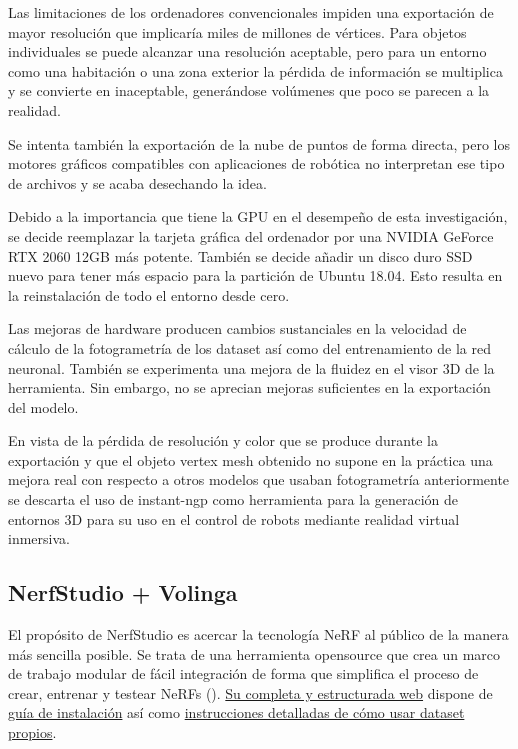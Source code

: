 \documentclass[a4paper, 12pt, spanish, twoside]{article}
\begin{document}
Las limitaciones de los ordenadores convencionales impiden una exportación de mayor resolución que implicaría miles de millones de vértices. Para objetos individuales se puede alcanzar una resolución aceptable, pero para un entorno como una habitación o una zona exterior la pérdida de información se multiplica y se convierte en inaceptable, generándose volúmenes que poco se parecen a la realidad. 



Se intenta también la exportación de la nube de puntos de forma directa, pero los motores gráficos compatibles con aplicaciones de robótica no interpretan ese tipo de archivos y se acaba desechando la idea.

Debido a la importancia que tiene la GPU en el desempeño de esta investigación, se decide reemplazar la tarjeta gráfica del ordenador por una NVIDIA GeForce RTX 2060 12GB más potente. También se decide añadir un disco duro SSD nuevo para tener más espacio para la partición de Ubuntu 18.04. Esto resulta en la reinstalación de todo el entorno desde cero.

Las mejoras de hardware producen cambios sustanciales en la velocidad de cálculo de la fotogrametría de los dataset así como del entrenamiento de la red neuronal. También se experimenta una mejora de la fluidez en el visor 3D de la herramienta. Sin embargo, no se aprecian mejoras suficientes en la exportación del modelo.

En vista de la pérdida de resolución y color que se produce durante la exportación y que el objeto vertex mesh obtenido no supone en la práctica una mejora real con respecto a otros modelos que usaban fotogrametría anteriormente se descarta el uso de instant-ngp como herramienta para la generación de entornos 3D para su uso en el control de robots mediante realidad virtual inmersiva.


\subsection{NerfStudio + Volinga}

El propósito de NerfStudio es acercar la tecnología NeRF al público de la manera más sencilla posible. Se trata de una herramienta opensource que crea un marco de trabajo modular de fácil integración de forma que simplifica el proceso de crear, entrenar y testear NeRFs (\cite{nerfstudio}). \href{https://docs.nerf.studio/index.html}{Su completa y estructurada web} dispone de \href{https://docs.nerf.studio/quickstart/installation.html}{guía de instalación} así como \href{https://docs.nerf.studio/quickstart/custom_dataset.html}{instrucciones detalladas de cómo usar dataset propios}.   
\end{document}
